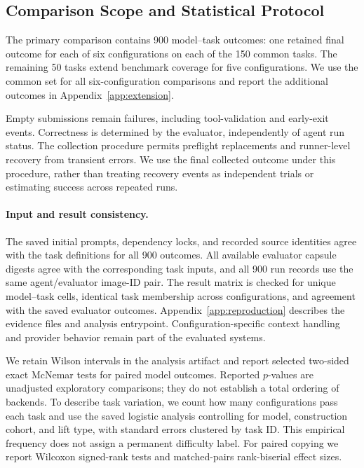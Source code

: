 \documentclass[acmsmall,screen,review,anonymous,nonacm]{acmart}
\begin{document}
\subsection{Comparison Scope and Statistical Protocol}

The primary comparison contains 900 model--task outcomes: one retained final
outcome for each of six configurations on each of the 150 common tasks.
The remaining 50 tasks extend benchmark coverage for five configurations.
We use the common set for all six-configuration comparisons and report the
additional outcomes in Appendix~\ref{app:extension}.

Empty submissions remain failures, including tool-validation and early-exit
events. Correctness is determined by the evaluator, independently of agent
run status. The collection procedure permits preflight replacements and
runner-level recovery from transient errors. We use the final collected
outcome under this procedure, rather than treating recovery events as
independent trials or estimating success across repeated runs.

\paragraph{Input and result consistency.}
The saved initial prompts, dependency locks, and recorded source identities
agree with the task definitions for all 900 outcomes. All available evaluator
capsule digests agree with the corresponding task inputs, and all 900 run
records use the same agent/evaluator image-ID pair. The result matrix is
checked for unique model--task cells, identical task membership across
configurations, and agreement with the saved evaluator outcomes.
Appendix~\ref{app:reproduction} describes the evidence files and analysis
entrypoint. Configuration-specific context handling and provider behavior
remain part of the evaluated systems.


We retain Wilson intervals in the analysis artifact and report selected
two-sided exact McNemar tests for paired model outcomes. Reported $p$-values are
unadjusted exploratory comparisons; they do not establish a total ordering of
backends. To describe task variation, we count how many configurations pass each task
and use the saved logistic analysis controlling for model, construction cohort,
and lift type, with standard errors clustered by task ID. This empirical frequency does not assign a
permanent difficulty label.
For paired copying we report Wilcoxon signed-rank tests and matched-pairs
rank-biserial effect sizes.
\end{document}
